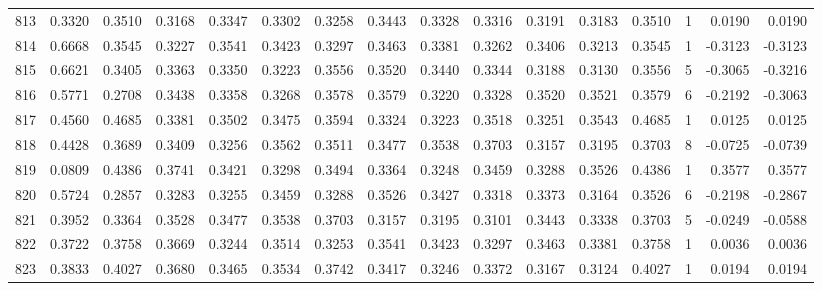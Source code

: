\begin{tabular}{lrrrrrrrrrrrrrrr}
813 &      0.3320 &  0.3510 &  0.3168 &  0.3347 &  0.3302 &  0.3258 &  0.3443 &  0.3328 &  0.3316 &  0.3191 &   0.3183 &     0.3510 &      1 &                    0.0190 &                     0.0190 \\
814 &      0.6668 &  0.3545 &  0.3227 &  0.3541 &  0.3423 &  0.3297 &  0.3463 &  0.3381 &  0.3262 &  0.3406 &   0.3213 &     0.3545 &      1 &                   -0.3123 &                    -0.3123 \\
815 &      0.6621 &  0.3405 &  0.3363 &  0.3350 &  0.3223 &  0.3556 &  0.3520 &  0.3440 &  0.3344 &  0.3188 &   0.3130 &     0.3556 &      5 &                   -0.3065 &                    -0.3216 \\
816 &      0.5771 &  0.2708 &  0.3438 &  0.3358 &  0.3268 &  0.3578 &  0.3579 &  0.3220 &  0.3328 &  0.3520 &   0.3521 &     0.3579 &      6 &                   -0.2192 &                    -0.3063 \\
817 &      0.4560 &  0.4685 &  0.3381 &  0.3502 &  0.3475 &  0.3594 &  0.3324 &  0.3223 &  0.3518 &  0.3251 &   0.3543 &     0.4685 &      1 &                    0.0125 &                     0.0125 \\
818 &      0.4428 &  0.3689 &  0.3409 &  0.3256 &  0.3562 &  0.3511 &  0.3477 &  0.3538 &  0.3703 &  0.3157 &   0.3195 &     0.3703 &      8 &                   -0.0725 &                    -0.0739 \\
819 &      0.0809 &  0.4386 &  0.3741 &  0.3421 &  0.3298 &  0.3494 &  0.3364 &  0.3248 &  0.3459 &  0.3288 &   0.3526 &     0.4386 &      1 &                    0.3577 &                     0.3577 \\
820 &      0.5724 &  0.2857 &  0.3283 &  0.3255 &  0.3459 &  0.3288 &  0.3526 &  0.3427 &  0.3318 &  0.3373 &   0.3164 &     0.3526 &      6 &                   -0.2198 &                    -0.2867 \\
821 &      0.3952 &  0.3364 &  0.3528 &  0.3477 &  0.3538 &  0.3703 &  0.3157 &  0.3195 &  0.3101 &  0.3443 &   0.3338 &     0.3703 &      5 &                   -0.0249 &                    -0.0588 \\
822 &      0.3722 &  0.3758 &  0.3669 &  0.3244 &  0.3514 &  0.3253 &  0.3541 &  0.3423 &  0.3297 &  0.3463 &   0.3381 &     0.3758 &      1 &                    0.0036 &                     0.0036 \\
823 &      0.3833 &  0.4027 &  0.3680 &  0.3465 &  0.3534 &  0.3742 &  0.3417 &  0.3246 &  0.3372 &  0.3167 &   0.3124 &     0.4027 &      1 &                    0.0194 &                     0.0194 \\

\end{tabular}
